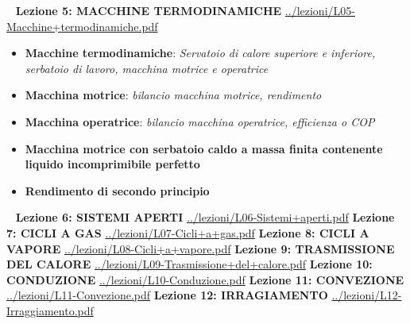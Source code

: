 \documentclass[a4paper, 9pt]{article}
\begin{document}
    \ \newline
    \newline
    \textbf{Lezione 5: MACCHINE TERMODINAMICHE}\newline
    \url{../lezioni/L05-Macchine+termodinamiche.pdf}
    \begin{itemize}
        \item \textbf{Macchine termodinamiche}: \textit{Servatoio di calore superiore e inferiore, serbatoio di lavoro, macchina motrice e operatrice}
        \item \textbf{Macchina motrice}: \textit{bilancio macchina motrice, rendimento}
        \item \textbf{Macchina operatrice}: \textit{bilancio macchina operatrice, efficienza o COP}
        \item \textbf{Macchina motrice con serbatoio caldo a massa finita
        contenente liquido incomprimibile perfetto}
        \item \textbf{Rendimento di secondo principio}
    \end{itemize}
    \ \newline
    \newline
    \textbf{Lezione 6: SISTEMI APERTI}\newline
    \url{../lezioni/L06-Sistemi+aperti.pdf}
    \newline
    \newline
    \textbf{Lezione 7: CICLI A GAS}\newline
    \url{../lezioni/L07-Cicli+a+gas.pdf}
    \newline
    \newline
    \textbf{Lezione 8: CICLI A VAPORE}\newline
    \url{../lezioni/L08-Cicli+a+vapore.pdf}
    \newline
    \newline
    \textbf{Lezione 9: TRASMISSIONE DEL CALORE}\newline
    \url{../lezioni/L09-Trasmissione+del+calore.pdf}
    \newline
    \newline
    \textbf{Lezione 10: CONDUZIONE}\newline
    \url{../lezioni/L10-Conduzione.pdf}
    \newline
    \newline
    \textbf{Lezione 11: CONVEZIONE}\newline
    \url{../lezioni/L11-Convezione.pdf}
    \newline
    \newline
    \textbf{Lezione 12: IRRAGIAMENTO}\newline
    \url{../lezioni/L12-Irraggiamento.pdf}
    \newpage
\end{document}
